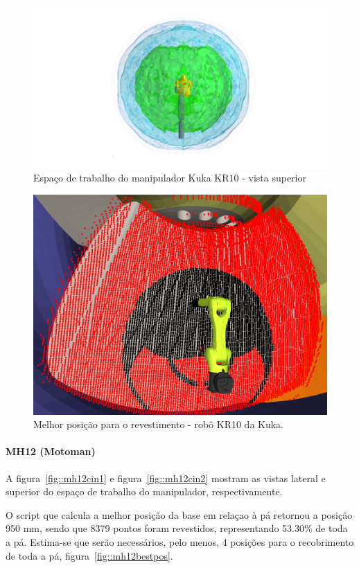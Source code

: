 \begin{figure}[h!]	
	\centering
	\includegraphics[width=\columnwidth]{detail/figs/bighatch/kr10_top.png}
	\caption{Espaço de trabalho do manipulador Kuka KR10 - vista superior}
	\label{fig::kr10cin2}
\end{figure}

\begin{figure}[h!]	
	\centering
	\includegraphics[width=0.7\columnwidth]{detail/figs/bighatch/kr10_bestpos.png}
	\caption{Melhor posição para o revestimento - robô KR10 da Kuka.}
	\label{fig::kr10bestpos}
\end{figure}


\paragraph{MH12 (Motoman)}
A figura~\ref{fig::mh12cin1} e figura~\ref{fig::mh12cin2} mostram as vistas
lateral e superior do espaço de trabalho do manipulador, respectivamente.

O script que calcula a melhor posição da base em relaçao à pá retornou a posição
950 mm, sendo que 8379 pontos foram revestidos, representando 53.30\% de toda a
pá. Estima-se que serão necessários, pelo menos, 4 posições para o recobrimento
de toda a pá, figura~\ref{fig::mh12bestpos}.

